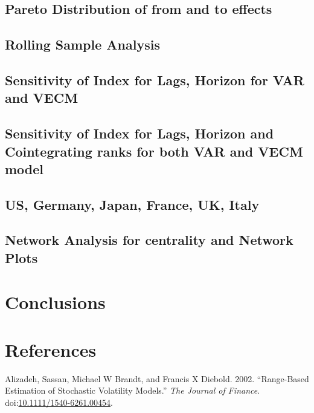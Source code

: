\documentclass[]{elsarticle} %
\begin{document}
\subsection{Pareto Distribution of from and to
effects}\label{pareto-distribution-of-from-and-to-effects}

\subsection{Rolling Sample Analysis}\label{rolling-sample-analysis}

\subsection{Sensitivity of Index for Lags, Horizon for VAR and
VECM}\label{sensitivity-of-index-for-lags-horizon-for-var-and-vecm}

\subsection{Sensitivity of Index for Lags, Horizon and Cointegrating
ranks for both VAR and VECM
model}\label{sensitivity-of-index-for-lags-horizon-and-cointegrating-ranks-for-both-var-and-vecm-model}

\subsection{US, Germany, Japan, France, UK,
Italy}\label{us-germany-japan-france-uk-italy}

\subsection{Network Analysis for centrality and Network
Plots}\label{network-analysis-for-centrality-and-network-plots}

\section{Conclusions}\label{conclusions}

\section*{References}\label{references}

\hypertarget{refs}{}
\hypertarget{ref-Alizadeh2002}{}
Alizadeh, Sassan, Michael W Brandt, and Francis X Diebold. 2002.
``Range-Based Estimation of Stochastic Volatility Models.'' \emph{The
Journal of Finance}.
doi:\href{https://doi.org/10.1111/1540-6261.00454}{10.1111/1540-6261.00454}.
\end{document}
